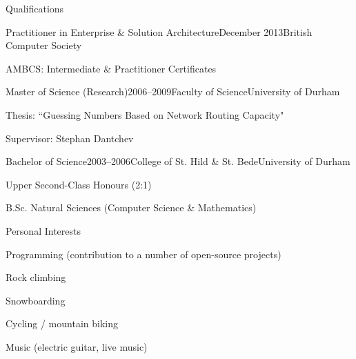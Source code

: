 \documentclass{cv}
\begin{document}
\begin{rSection}{Qualifications}

\begin{rSubsection}{Practitioner in Enterprise \& Solution Architecture}{December 2013}{British Computer Society}{}
\item AMBCS: Intermediate \& Practitioner Certificates
\end{rSubsection}

\begin{rSubsection}{Master of Science (Research)}{2006--2009}{Faculty of Science}{University of Durham}
\item Thesis: ``Guessing Numbers Based on Network Routing Capacity"
\item Supervisor: Stephan Dantchev
\end{rSubsection}

\begin{rSubsection}{Bachelor of Science}{2003--2006}{College of St. Hild \& St. Bede}{University of Durham}
\item Upper Second-Class Honours (2:1)
\item B.Sc. Natural Sciences (Computer Science \& Mathematics)
\end{rSubsection}

\end{rSection}


\begin{rSection}{Personal Interests}

\begin{rSubsection}{}{}{}{}
\item Programming (contribution to a number of open-source projects)
\item Rock climbing
\item Snowboarding
\item Cycling / mountain biking
\item Music (electric guitar, live music)
\end{rSubsection}

\end{rSection}

\end{document}

